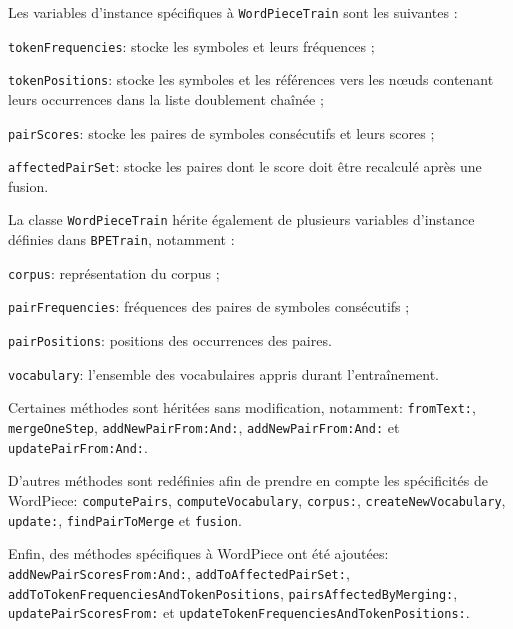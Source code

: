 \documentclass[12pt,a4paper]{report}
\begin{document}
	Les variables d’instance spécifiques à \texttt{WordPieceTrain} sont les suivantes :
	
	\begin{itemizeFB}
		\item \texttt{tokenFrequencies}: stocke les symboles et leurs fréquences ;
		
		\item \texttt{tokenPositions}: stocke les symboles et les références vers les nœuds contenant leurs occurrences dans la liste doublement chaînée ;
		
		\item \texttt{pairScores}: stocke les paires de symboles consécutifs et leurs scores ;
		
		\item \texttt{affectedPairSet}: stocke les paires dont le score doit être recalculé après une fusion.
	\end{itemizeFB}
	
	La classe \texttt{WordPieceTrain} hérite également de plusieurs variables d’instance définies dans \texttt{BPETrain}, notamment :
	
	\begin{itemizeFB}
		\item \texttt{corpus}: représentation du corpus ;
		
		\item \texttt{pairFrequencies}: fréquences des paires de symboles consécutifs ;
		
		\item \texttt{pairPositions}: positions des occurrences des paires.
		
		\item \texttt{vocabulary}: l'ensemble des vocabulaires appris durant l'entraînement.
	\end{itemizeFB}
	
	Certaines méthodes sont héritées sans modification, notamment: \texttt{fromText:}, \texttt{mergeOneStep}, \texttt{addNewPairFrom:And:}, \texttt{addNewPairFrom:And:} et \texttt{updatePairFrom:And:}.
	
	D’autres méthodes sont redéfinies afin de prendre en compte les spécificités de WordPiece: \texttt{computePairs}, \texttt{computeVocabulary}, \texttt{corpus:}, \texttt{createNewVocabulary}, \texttt{update:}, \texttt{findPairToMerge} et \texttt{fusion}.
	
	Enfin, des méthodes spécifiques à WordPiece ont été ajoutées: \texttt{addNewPairScoresFrom:And:}, \texttt{addToAffectedPairSet:}, \texttt{addToTokenFrequenciesAndTokenPositions}, \texttt{pairsAffectedByMerging:}, \texttt{updatePairScoresFrom:} et \texttt{updateTokenFrequenciesAndTokenPositions:}.
	
\end{document}
